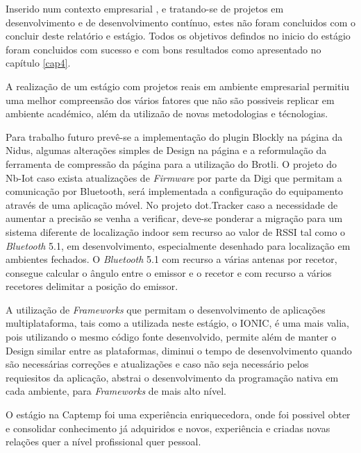 \par Inserido num contexto empresarial , e tratando-se de projetos em desenvolvimento e de desenvolvimento contínuo, estes não foram concluidos com o concluir deste relatório e estágio. Todos os objetivos defindos no inicio do estágio foram concluidos com sucesso e com bons resultados como apresentado no capítulo \ref{cap4}. 
\par A realização de um estágio com projetos reais em ambiente empresarial permitiu uma melhor compreensão dos vários fatores que  não são possiveis replicar em ambiente académico, além da utilizaão de novas metodologias e técnologias.

\par Para trabalho futuro prevê-se a implementação do plugin Blockly na página da Nidus, algumas alterações simples de Design na página e a reformulação da ferramenta de compressão da página para a utilização do Brotli.
O projeto do Nb-Iot caso exista atualizações de \textit{Firmware} por parte da Digi que permitam a comunicação por Bluetooth, será implementada a configuração do equipamento através de uma aplicação móvel. No projeto dot.Tracker caso a necessidade de aumentar a precisão se venha a verificar, deve-se ponderar a migração para um sistema diferente de localização indoor sem recurso ao valor de RSSI tal como o \textit{Bluetooth} 5.1, em desenvolvimento, especialmente desenhado para localização em ambientes fechados. O \textit{Bluetooth} 5.1 com recurso a várias antenas por recetor, consegue calcular o ângulo entre o emissor e o recetor e com recurso a vários recetores delimitar a posição do emissor.

\par A utilização de \textit{Frameworks} que permitam o desenvolvimento de aplicações multiplataforma, tais como a utilizada neste estágio, o IONIC, é uma mais valia, pois utilizando o mesmo código fonte desenvolvido, permite além de manter o Design similar entre as plataformas, diminui o tempo de desenvolvimento quando são necessárias correções e atualizações e caso não seja necessário pelos requiesitos da aplicação, abstrai o desenvolvimento da programação nativa em cada ambiente, para \textit{Frameworks} de mais alto nível.

\par O estágio na Captemp foi uma experiência enriquecedora, onde foi possivel obter e consolidar conhecimento já adquiridos e novos, experiência e criadas novas relações quer a nível profissional quer pessoal.